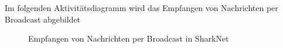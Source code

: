 \documentclass[german, 12pt]{book}
\begin{document}
\newpage

Im folgenden Aktivitätsdiagramm wird das Empfangen von Nachrichten per Broadcast abgebildet
\begin{figure}[H]
	\centering
	\hspace*{1cm}
	\caption{Empfangen von Nachrichten per Broadcast in SharkNet}
	\label{fig:broadcastReceive}
\end{figure}

\newpage
\end{document}
